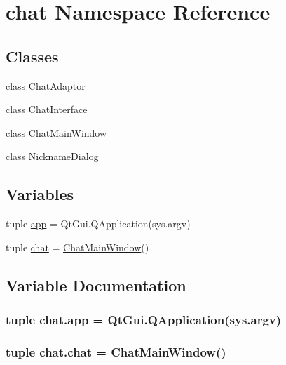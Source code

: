 \hypertarget{namespacechat}{}\section{chat Namespace Reference}
\label{namespacechat}
\subsection*{Classes}
\begin{DoxyCompactItemize}
\item 
class \hyperlink{classchat_1_1ChatAdaptor}{Chat\+Adaptor}
\item 
class \hyperlink{classchat_1_1ChatInterface}{Chat\+Interface}
\item 
class \hyperlink{classchat_1_1ChatMainWindow}{Chat\+Main\+Window}
\item 
class \hyperlink{classchat_1_1NicknameDialog}{Nickname\+Dialog}
\end{DoxyCompactItemize}
\subsection*{Variables}
\begin{DoxyCompactItemize}
\item 
tuple \hyperlink{namespacechat_a9ec17dfeb97b340ba212bcc89a776d8e}{app} = Qt\+Gui.\+Q\+Application(sys.\+argv)
\item 
tuple \hyperlink{namespacechat_a296f5b853993809225614d4ceccffbf6}{chat} = \hyperlink{classchat_1_1ChatMainWindow}{Chat\+Main\+Window}()
\end{DoxyCompactItemize}


\subsection{Variable Documentation}
\hypertarget{namespacechat_a9ec17dfeb97b340ba212bcc89a776d8e}{}
\subsubsection[{app}]{\setlength{\rightskip}{0pt plus 5cm}tuple chat.\+app = Qt\+Gui.\+Q\+Application(sys.\+argv)}\label{namespacechat_a9ec17dfeb97b340ba212bcc89a776d8e}
\hypertarget{namespacechat_a296f5b853993809225614d4ceccffbf6}{}
\subsubsection[{chat}]{\setlength{\rightskip}{0pt plus 5cm}tuple chat.\+chat = {\bf Chat\+Main\+Window}()}\label{namespacechat_a296f5b853993809225614d4ceccffbf6}
